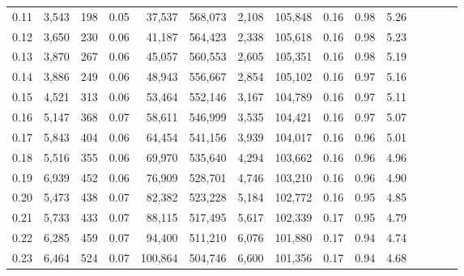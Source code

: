 \begin{tabular}{rrrcrrrrrrrrrrr}
0.11 &   3,543 &    198 &                                       0.05 &   37,537 &  568,073 &    2,108 &  105,848 &  0.16 &  0.98 &                         5.26 \\
0.12 &   3,650 &    230 &                                       0.06 &   41,187 &  564,423 &    2,338 &  105,618 &  0.16 &  0.98 &                         5.23 \\
0.13 &   3,870 &    267 &                                       0.06 &   45,057 &  560,553 &    2,605 &  105,351 &  0.16 &  0.98 &                         5.19 \\
0.14 &   3,886 &    249 &                                       0.06 &   48,943 &  556,667 &    2,854 &  105,102 &  0.16 &  0.97 &                         5.16 \\
0.15 &   4,521 &    313 &                                       0.06 &   53,464 &  552,146 &    3,167 &  104,789 &  0.16 &  0.97 &                         5.11 \\
0.16 &   5,147 &    368 &                                       0.07 &   58,611 &  546,999 &    3,535 &  104,421 &  0.16 &  0.97 &                         5.07 \\
0.17 &   5,843 &    404 &                                       0.06 &   64,454 &  541,156 &    3,939 &  104,017 &  0.16 &  0.96 &                         5.01 \\
0.18 &   5,516 &    355 &                                       0.06 &   69,970 &  535,640 &    4,294 &  103,662 &  0.16 &  0.96 &                         4.96 \\
0.19 &   6,939 &    452 &                                       0.06 &   76,909 &  528,701 &    4,746 &  103,210 &  0.16 &  0.96 &                         4.90 \\
0.20 &   5,473 &    438 &                                       0.07 &   82,382 &  523,228 &    5,184 &  102,772 &  0.16 &  0.95 &                         4.85 \\
0.21 &   5,733 &    433 &                                       0.07 &   88,115 &  517,495 &    5,617 &  102,339 &  0.17 &  0.95 &                         4.79 \\
0.22 &   6,285 &    459 &                                       0.07 &   94,400 &  511,210 &    6,076 &  101,880 &  0.17 &  0.94 &                         4.74 \\
0.23 &   6,464 &    524 &                                       0.07 &  100,864 &  504,746 &    6,600 &  101,356 &  0.17 &  0.94 &                         4.68 \\

\end{tabular}
